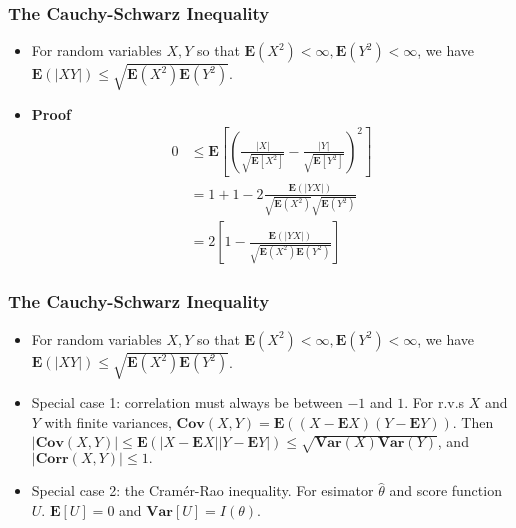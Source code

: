 \documentclass[handout]{beamer}
\newcommand{\BE}{\mathbf{E}}
\newcommand{\BV}{\mathbf{Var}}
\begin{document}
\frame
{
  \frametitle{The Cauchy-Schwarz Inequality}

   \begin{itemize}
       \item<1->[]
   \begin{Theorem} For random variables $X, Y$ so that $\BE(X^2)<\infty, \BE(Y^2)<\infty$, we have $\BE(|XY|) \leq \sqrt{\BE(X^2)\BE(Y^2)} $. 
   \end{Theorem}

\item<2-> \textbf{Proof} 
\begin{align*}
0 &\le \BE\left[ \left( \frac{|X| }{\sqrt{ \BE[X^2] }} - \frac{|Y| }{\sqrt{ \BE[Y^2] }} \right)^2 \right]\\
&= 1 + 1 -2 \frac{\BE(|YX|) }{\sqrt{\BE(X^2)}\sqrt{\BE(Y^2)} } \\
&= 2\left[1 - \frac{\BE(|YX|) }{\sqrt{\BE(X^2) \BE(Y^2)} }\right]
\end{align*}

\end{itemize}
}


\frame
{
  \frametitle{The Cauchy-Schwarz Inequality}

   \begin{itemize}
       \item<1->[]
   \begin{Theorem} For random variables $X, Y$ so that $\BE(X^2)<\infty, \BE(Y^2)<\infty$, we have $\BE(|XY|) \leq \sqrt{\BE(X^2)\BE(Y^2)} $. 
   \end{Theorem}

\item<2-> Special case 1: correlation must always be between $-1$ and $1$. For r.v.s $X$ and $Y$ with finite variances, $\mathbf{Cov} (X, Y)= \BE((X-\BE X)(Y-\BE Y ))$. Then $|\mathbf{Cov} (X, Y)|\leq \BE(|X-\BE X||Y-\BE Y|)\leq \sqrt{\BV(X)\BV(Y)}$, and $|\mathbf{Corr} (X,Y)|\leq 1.$

\item<3-> Special case 2: the Cram\'er-Rao inequality. For esimator $\hat{\theta}$ and score function $U$. $\BE[U] = 0$ and $\BV\left[ U\right] = I(\theta)$. 
         
\end{itemize}
}
\end{document}
